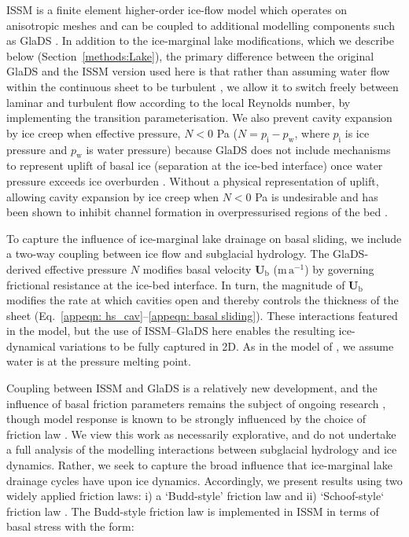 \documentclass[tc, manuscript]{copernicus}
\begin{document}
ISSM is a finite element higher-order ice-flow model which operates on anisotropic meshes and can be coupled to additional modelling components such as GlaDS \citep{larour2012continental}. In addition to the ice-marginal lake modifications, which we describe below (Section~\ref{methods:Lake}), the primary difference between the original GlaDS \citep{werder2013modeling} and the ISSM version used here \citep{ehrenfeucht2023seasonal} is that rather than assuming water flow within the continuous sheet to be turbulent \citep[cf:][]{werder2013modeling}, we allow it to switch freely between laminar and turbulent flow according to the local Reynolds number, by implementing the \citet{hill2024improved} transition parameterisation. We also prevent cavity expansion by ice creep when effective pressure, $N < 0$ Pa ($N=p_{\mathrm{i}}-p_{\mathrm{w}}$, where $p_{\mathrm{i}}$ is ice pressure and $p_{\mathrm{w}}$ is water pressure) because GlaDS does not include mechanisms to represent uplift of basal ice (separation at the ice-bed interface) once water pressure exceeds ice overburden \citep[e.g.,][]{tsai2010model,schoof2012flotation,dow2015modeling}. Without a physical representation of uplift, allowing cavity expansion by ice creep when $N<0$ Pa is undesirable and has been shown to inhibit channel formation in overpressurised regions of the bed \citep{hill2024improved}.

To capture the influence of ice-marginal lake drainage on basal sliding, we include a two-way coupling between ice flow and subglacial hydrology. The GlaDS-derived effective pressure $N$ modifies basal velocity $\mathbf{U}_{\mathrm{b}}$ ($\mathrm{m}\, \mathrm{a}^{-1}$) by governing frictional resistance at the ice-bed interface. In turn, the magnitude of $\mathbf{U}_{\mathrm{b}}$ modifies the rate at which cavities open and thereby controls the thickness of the sheet (Eq.~\ref{appeqn: hs_cav}--\ref{appeqn: basal sliding}). These interactions featured in the \citet{kingslake2013modelling} model, but the use of ISSM--GlaDS here enables the resulting ice-dynamical variations to be fully captured in 2D. As in the model of \citet{kingslake2013modelling}, we assume water is at the pressure melting point.

Coupling between ISSM and GlaDS is a relatively new development, and the influence of basal friction parameters remains the subject of ongoing research \citep[e.g.,][]{khan2024inland,McArthur2026impact}, though model response is known to be strongly influenced by the choice of friction law \citep{choi2023impact}. We view this work as necessarily explorative, and do not undertake a full analysis of the modelling interactions between subglacial hydrology and ice dynamics. Rather, we seek to capture the broad influence that ice-marginal lake drainage cycles have upon ice dynamics. Accordingly, we present results using two widely applied friction laws: i) a `Budd-style' friction law \citep{budd1984three} and ii) `Schoof-style` friction law \citep{schoof2005effect,gagliardini2007finite}. The Budd-style friction law is implemented in ISSM in terms of basal stress with the form:
\end{document}
